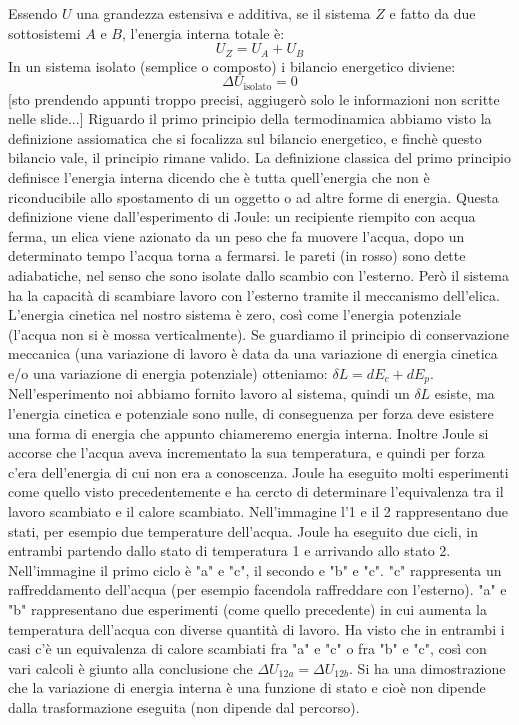 Essendo $U$ una grandezza estensiva e additiva, se il sistema $Z$ e fatto da due sottosistemi $A$ e $B$, l'energia interna totale è: 
\[
    U_Z = U_A + U_B
\]
In un sistema isolato (semplice o composto) i bilancio energetico diviene:
\[
    \Delta U_{\text{isolato}} = 0
\]
[sto prendendo appunti troppo precisi, aggiugerò solo le informazioni non scritte nelle slide...]
\newline[8]
\newline[9] Riguardo il primo principio della termodinamica abbiamo visto la definizione assiomatica che si focalizza sul bilancio energetico, e finchè questo bilancio vale, il principio rimane valido. La definizione classica del primo principio definisce l'energia interna dicendo che è tutta quell'energia che non è riconducibile allo spostamento di un oggetto o ad altre forme di energia. Questa definizione viene dall'esperimento di Joule: un recipiente riempito con acqua ferma, un elica viene azionato da un peso che fa muovere l'acqua, dopo un determinato tempo l'acqua torna a fermarsi.
\newline[10] le pareti (in rosso) sono dette adiabatiche, nel senso che sono isolate dallo scambio con l'esterno. Però il sistema ha la capacità di scambiare lavoro con l'esterno tramite il meccanismo dell'elica. L'energia cinetica nel nostro sistema è zero, così come l'energia potenziale (l'acqua non si è mossa verticalmente). Se guardiamo il principio di conservazione meccanica (una variazione di lavoro è data da una variazione di energia cinetica e/o una variazione di energia potenziale) otteniamo: $\delta L = d E_c + dE_p$. Nell'esperimento noi abbiamo fornito lavoro al sistema, quindi un $\delta L$ esiste, ma l'energia cinetica e potenziale sono nulle, di conseguenza per forza deve esistere una forma di energia che appunto chiameremo energia interna. Inoltre Joule si accorse che l'acqua aveva incrementato la sua temperatura, e quindi per forza c'era dell'energia di cui non era a conoscenza.
\newline[11] Joule ha eseguito molti esperimenti come quello visto precedentemente e ha cercto di determinare l'equivalenza tra il lavoro scambiato e il calore scambiato. Nell'immagine l'1 e il 2 rappresentano due stati, per esempio due temperature dell'acqua. Joule ha eseguito due cicli, in entrambi partendo dallo stato di temperatura 1 e arrivando allo stato 2. Nell'immagine il primo ciclo è "a" e "c", il secondo e "b" e "c". "c" rappresenta un raffreddamento dell'acqua (per esempio facendola raffreddare con l'esterno). "a" e "b" rappresentano due esperimenti (come quello precedente) in cui aumenta la temperatura dell'acqua con diverse quantità di lavoro. Ha visto che in entrambi i casi c'è un equivalenza di calore scambiati fra "a" e "c" o fra "b" e "c", così con vari calcoli è giunto alla conclusione che $\Delta U_{12a} = \Delta U_{12b}$. Si ha una dimostrazione che la variazione di energia interna è una funzione di stato e cioè non dipende dalla trasformazione eseguita (non dipende dal percorso).
